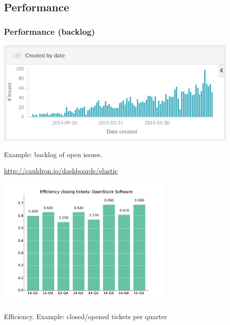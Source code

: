 \documentclass[17pt,aspectratio=169,hyperref=pdfusetitle]{beamer}
\begin{document}
\subsection{Performance}


\begin{frame}
\frametitle{Performance (backlog)}

\begin{center}
  \includegraphics[width=12cm]{figs/backlog-issues-elastic}
\end{center}

Example: backlog of open issues.

\begin{flushright}
  \url{http://cauldron.io/dashboards/elastic}
\end{flushright}

\end{frame}



\begin{frame}

\begin{center}
  \includegraphics[height=6.5cm]{figs/bmiOpenStackSoftware}
\end{center}

{\small
Efficiency.
Example: closed/opened tickets per quarter \\
}
\end{frame}
\end{document}
